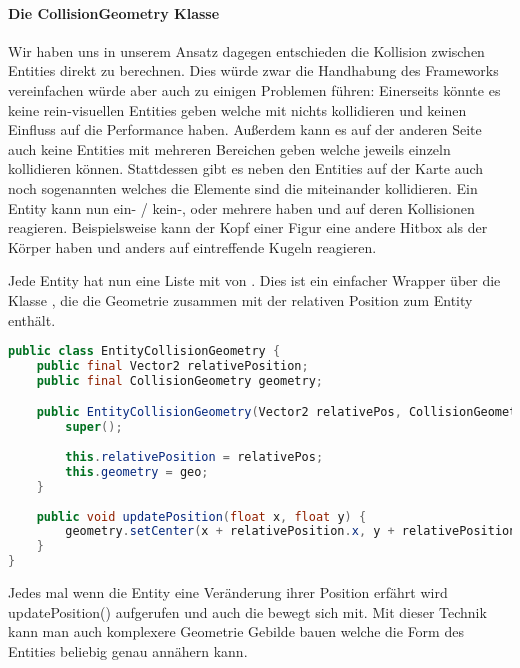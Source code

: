 \paragraph{Die CollisionGeometry Klasse}

Wir haben uns in unserem Ansatz dagegen entschieden die Kollision zwischen Entities direkt zu berechnen. Dies würde zwar die Handhabung des Frameworks vereinfachen würde aber auch zu einigen Problemen führen: Einerseits könnte es keine rein-visuellen Entities geben welche mit nichts kollidieren und keinen Einfluss auf die Performance haben. Außerdem kann es auf der anderen Seite auch keine Entities mit mehreren Bereichen geben welche jeweils einzeln kollidieren können. 
Stattdessen gibt es neben den Entities auf der Karte auch noch sogenannten  welches die Elemente sind die miteinander kollidieren.
Ein Entity kann nun ein- / kein-, oder mehrere  haben und auf deren Kollisionen reagieren. Beispielsweise kann der Kopf einer Figur eine andere Hitbox als der Körper haben und anders auf eintreffende Kugeln reagieren.

Jede Entity hat nun eine Liste mit von . Dies ist ein einfacher Wrapper über die Klasse , die die Geometrie zusammen mit der relativen Position zum Entity enthält.

\begin{lstlisting}[caption=Die Klasse EntityCollisionGeometry, title=\hspace{0 pt}, language=java]
public class EntityCollisionGeometry {
	public final Vector2 relativePosition;
	public final CollisionGeometry geometry;

	public EntityCollisionGeometry(Vector2 relativePos, CollisionGeometry geo) {
		super();
		
		this.relativePosition = relativePos;
		this.geometry = geo;
	}
	
	public void updatePosition(float x, float y) {
		geometry.setCenter(x + relativePosition.x, y + relativePosition.y);
	}
}
\end{lstlisting}

Jedes mal wenn die Entity eine Veränderung ihrer Position erfährt wird updatePosition() aufgerufen und auch die  bewegt sich mit.
Mit dieser Technik kann man auch komplexere Geometrie Gebilde bauen welche die Form des Entities beliebig genau annähern kann. \cite[S 500]{DGIJ} %

